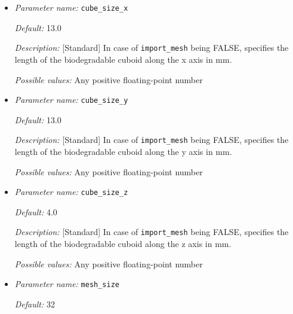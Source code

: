 \begin{itemize}
{\it Default:} 20.0

{\it Description:} [Standard] In case of {\tt import\_mesh} being FALSE, specifies the length of the container box (for the electrolyte) in mm.

{\it Possible values:} Any positive floating-point number


\item {\it Parameter name:} {\tt cube\_size\_x}
\label{parameters:cube_size_x}


{\it Default:} 13.0

{\it Description:} [Standard] In case of {\tt import\_mesh} being FALSE, specifies the length of the biodegradable  cuboid along the x axis in mm.

{\it Possible values:} Any positive floating-point number


\item {\it Parameter name:} {\tt cube\_size\_y}
\label{parameters:cube_size_y}


{\it Default:} 13.0

{\it Description:} [Standard] In case of {\tt import\_mesh} being FALSE, specifies the length of the biodegradable  cuboid along the y axis in mm.

{\it Possible values:} Any positive floating-point number


\item {\it Parameter name:} {\tt cube\_size\_z}
\label{parameters:cube_size_z}


{\it Default:} 4.0

{\it Description:} [Standard] In case of {\tt import\_mesh} being FALSE, specifies the length of the biodegradable  cuboid along the z axis in mm.


{\it Possible values:} Any positive floating-point number


\item {\it Parameter name:} {\tt mesh\_size}
\label{parameters:mesh_size}


{\it Default:} 32


\end{itemize}

